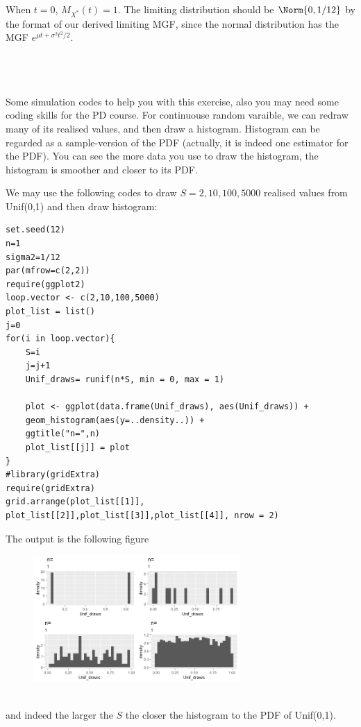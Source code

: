 \begin{exercise}
\begin{solution}
\begin{enumerate}
  When $t=0$, $M_{X^*}(t) =1$. 	
  The limiting distribution should be $\Norm{0,1/12}$ by the format of our derived limiting MGF, since the normal distribution has the MGF $e^{\mu t + \sigma^2t^2/2 }$.	
  	\end{enumerate}
  ~\\~\\~\\
  Some simulation codes to help you with this exercise, also you may need some coding skills for the PD course.
  For continuouse random varaible, we can redraw many of its realised values, and then draw a histogram. Histogram can be regarded as a sample-version of the PDF (actually, it is indeed one estimator for the PDF). You can see the more data you use to draw the histogram, the histogram is smoother and closer to its PDF. 
  
  We may use the following codes to draw $S=2,10,100,5000$ realised values from Unif(0,1) and then draw histogram:
  \begin{verbatim}
set.seed(12)
n=1
sigma2=1/12
par(mfrow=c(2,2))
require(ggplot2)
loop.vector <- c(2,10,100,5000)
plot_list = list()
j=0
for(i in loop.vector){ 
	S=i
	j=j+1
	Unif_draws= runif(n*S, min = 0, max = 1)  
	
	plot <- ggplot(data.frame(Unif_draws), aes(Unif_draws)) + 
	geom_histogram(aes(y=..density..)) +
	ggtitle("n=",n)
	plot_list[[j]] = plot
}
#library(gridExtra)
require(gridExtra)
grid.arrange(plot_list[[1]], plot_list[[2]],plot_list[[3]],plot_list[[4]], nrow = 2)
  \end{verbatim} 
 The output is the following figure~\\
 \begin{figure}[htbp!]
 	\includegraphics[width=0.7\textwidth]{0}
 \end{figure}  		   ~\\
 and indeed the larger the $S$ the closer the histogram to the PDF of Unif(0,1).\\~\\~\\
 

\end{solution}
\end{exercise}
